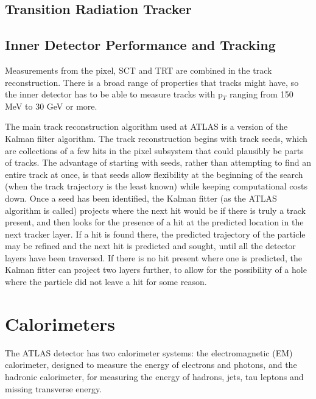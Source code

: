 \subsection{Transition Radiation Tracker}



 
\subsection{Inner Detector Performance and Tracking}
Measurements from the pixel, SCT and TRT are combined in the track reconstruction.  There is a broad range of properties that tracks might have, so the inner detector has to be able to measure tracks with p$_T$ ranging from 150 MeV to 30 GeV or more.   

The main track reconstruction algorithm used at ATLAS is a version of the Kalman filter algorithm.  The track reconstruction begins with track seeds, which are collections of a few hits in the pixel subsystem that could plausibly be parts of tracks.  The advantage of starting with seeds, rather than attempting to find an entire track at once, is that seeds allow flexibility at the beginning of the search (when the track trajectory is the least known) while keeping computational costs down.  Once a seed has been identified, the Kalman fitter (as the ATLAS algorithm is called) projects where the next hit would be if there is truly a track present, and then looks for the presence of a hit at the predicted location in the next tracker layer.  If a hit is found there, the predicted trajectory of the particle may be refined and the next hit is predicted and sought, until all the detector layers have been traversed. If there is no hit present where one is predicted, the Kalman fitter can project two layers further, to allow for the possibility of a hole where the particle did not leave a hit for some reason. 

\section{Calorimeters}
The ATLAS detector has two calorimeter systems: the electromagnetic (EM) calorimeter, designed to measure the energy of electrons and photons, and the hadronic calorimeter, for measuring the energy of hadrons, jets, tau leptons and missing transverse energy.  

